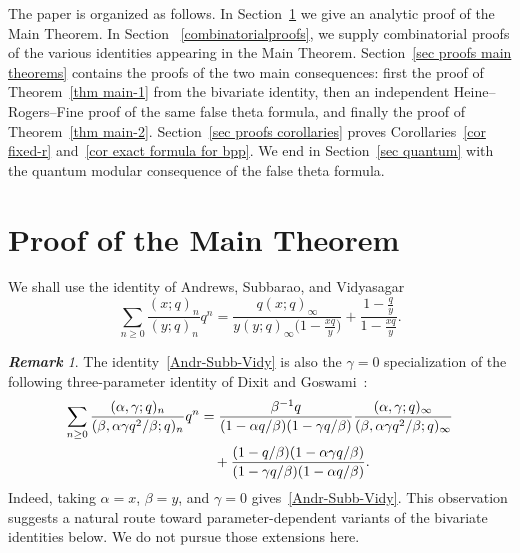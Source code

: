 \documentclass[reqno]{amsart}
\theoremstyle{definition}
\theoremstyle{plain}
\theoremstyle{remark}
\newtheorem{remark}{{\bf Remark}}
\numberwithin{equation}{section}
\newcommand{\fr}{\frac}
\begin{document}
The paper is organized as follows. In Section~\ref{sec proof master} we give an analytic proof of the Main Theorem. In Section ~\ref{combinatorialproofs}, we supply combinatorial proofs of the various identities appearing in the Main Theorem. Section~\ref{sec proofs main theorems} contains the proofs of the two main consequences: first the proof of Theorem~\ref{thm main-1} from the bivariate identity, then an independent Heine--Rogers--Fine proof of the same false theta formula, and finally the proof of Theorem~\ref{thm main-2}. Section~\ref{sec proofs corollaries} proves Corollaries~\ref{cor fixed-r} and~\ref{cor exact formula for bpp}. We end in Section~\ref{sec quantum} with the quantum modular consequence of the false theta formula.
%
\section{Proof of the Main Theorem}\label{sec proof master}
%
We shall use the identity of Andrews, Subbarao, and Vidyasagar~\cite{And-Sub-Vid}
\begin{equation}\label{Andr-Subb-Vidy}
\sum_{n\geq 0} \fr{(x;q)_n}{(y;q)_n} q^n
=\fr{q(x;q)_\infty}{y(y;q)_\infty \big(1-\fr{xq}{y}\big)} + \fr{1-\fr{q}{y}}{1-\fr{xq}{y}}.
\end{equation}

\begin{remark}\label{rem DG specialization}
The identity~\eqref{Andr-Subb-Vidy} is also the $\gamma=0$ specialization of the following three-parameter identity of Dixit and Goswami~\cite[Theorem~1.3]{Dixit-Goswami}:
\begin{align}
\sum_{n\ge 0}\frac{(\alpha,\gamma;q)_n}{(\beta,\alpha\gamma q^2/\beta;q)_n}q^n
&=\frac{\beta^{-1}q}{(1-\alpha q/\beta)(1-\gamma q/\beta)}
\frac{(\alpha,\gamma;q)_\infty}{(\beta,\alpha\gamma q^2/\beta;q)_\infty} \notag\\
&\quad+\frac{(1-q/\beta)(1-\alpha\gamma q/\beta)}{(1-\gamma q/\beta)(1-\alpha q/\beta)}. \label{eq DG three parameter}
\end{align}
Indeed, taking $\alpha=x$, $\beta=y$, and $\gamma=0$ gives~\eqref{Andr-Subb-Vidy}.  This observation suggests a natural route toward parameter-dependent variants of the bivariate identities below.  We do not pursue those extensions here.
\end{remark}
\end{document}
